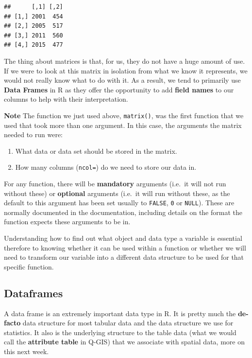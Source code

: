 \documentclass[
]{book}
\providecommand{\tightlist}{%
  \setlength{\itemsep}{0pt}\setlength{\parskip}{0pt}}
\begin{document}
\begin{verbatim}
##      [,1] [,2]
## [1,] 2001  454
## [2,] 2005  517
## [3,] 2011  560
## [4,] 2015  477
\end{verbatim}

The thing about matrices is that, for us, they do not have a huge amount of use. If we were to look at this matrix in isolation from what we know it represents, we would not really know what to do with it. As a result, we tend to primarily use \textbf{Data Frames} in R as they offer the opportunity to add \textbf{field names} to our columns to help with their interpretation.

\textbf{Note}
The function we just used above, \texttt{matrix()}, was the first function that we used that took more than one argument.
In this case, the arguments the matrix needed to run were:

\begin{enumerate}
\def\labelenumi{\arabic{enumi}.}
\tightlist
\item
  What data or data set should be stored in the matrix.
\item
  How many columns (\texttt{ncol=}) do we need to store our data in.
\end{enumerate}

For any function, there will be \textbf{mandatory} arguments (i.e.~it will not run without these) or \textbf{optional} arguments (i.e.~it will run without these, as the default to this argument has been set usually to \texttt{FALSE}, \texttt{0} or \texttt{NULL}). These are normally documented in the documentation, including details on the format the function expects these arguments to be in.

Understanding how to find out what object and data type a variable is essential therefore to knowing whether it can be used within a function or whether we will need to transform our variable into a different data structure to be used for that specific function.

\hypertarget{dataframes}{%
\subsection{Dataframes}\label{dataframes}}

A data frame is an extremely important data type in R. It is pretty much the \textbf{de-facto} data structure for most tabular data and the data structure we use for statistics. It also is the underlying structure to the table data (what we would call the \textbf{attribute table} in Q-GIS) that we associate with spatial data, more on this next week.
\end{document}
